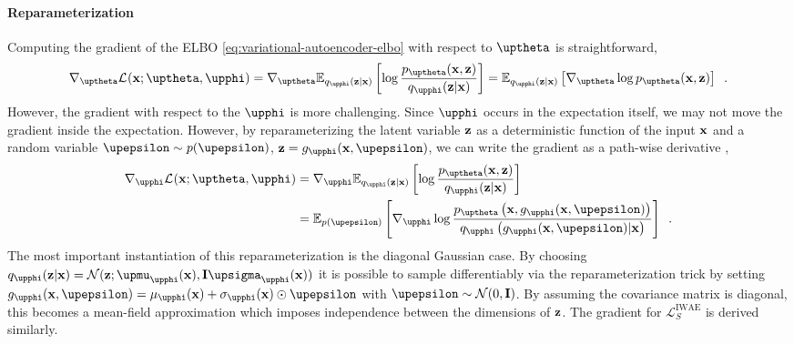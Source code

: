 \paragraph{Reparameterization} 
Computing the gradient of the ELBO \cref{eq:variational-autoencoder-elbo} with respect to $\thetab$ is straightforward,
%
\begin{equation}
    \nabla_\thetab \mathcal{L}_{}(\xb;\thetab,\phib)
    = \nabla_\thetab \mathbb{E}_{q_\phib(\zb|\xb)} \left[ \log \frac{p_\thetab(\xb,\zb)}{q_\phib(\zb|\xb)} \right] 
    = \mathbb{E}_{q_\phib(\zb|\xb)} \left[ \nabla_\thetab \log p_\thetab(\xb,\zb) \right] \enspace .
\end{equation}
%
However, the gradient with respect to the $\phib$ is more challenging. Since $\phib$ occurs in the expectation itself, we may not move the gradient inside the expectation. 
However, by reparameterizing the latent variable ${\mathbf{z}}$ as a deterministic function of the input ${\mathbf{x}}$ and a random variable $\epsilonb\sim p(\epsilonb)$, $\zb = g_\phib(\xb,\epsilonb)$, we can write the gradient as a path-wise derivative \parencite{kingma_autoencoding_2014,rezende_stochastic_2014,mohamed_monte_2019},
%
\begin{align}
    \nabla_\phib \mathcal{L}_{}(\xb;\thetab,\phib)
    &= \nabla_\phib \mathbb{E}_{q_\phib(\zb|\xb)} \left[ \log \frac{p_\thetab(\xb,\zb)}{q_\phib(\zb|\xb)} \right] \nonumber \\
    &= \mathbb{E}_{p(\epsilonb)} \left[ \nabla_\phib \log \frac{p_\thetab\left(\xb,g_\phib(\xb,\epsilonb)\right)}{q_\phib\left(g_\phib(\xb,\epsilonb)|\xb\right)} \right] \enspace .
\end{align}
%
The most important instantiation of this reparameterization is the diagonal Gaussian case. 
By choosing $q_\phib(\zb|\xb) = \mathcal{N}(\zb; \mub_\phib(\xb), \mathbf{I}\sigmab_\phib(\xb))$ it is possible to sample differentiably via the reparameterization trick by setting $g_\phib(\xb,\epsilonb) = \mu_\phib(\xb) + \sigma_\phib(\xb) \odot \epsilonb$ with $\epsilonb\sim\mathcal{N}(0,\mathbf{I})$. 
By assuming the covariance matrix is diagonal, this becomes a mean-field approximation which imposes independence between the dimensions of ${\mathbf{z}}$. 
The gradient for $\mathcal{L}^{\text{IWAE}}_{S}$ is derived similarly. 

